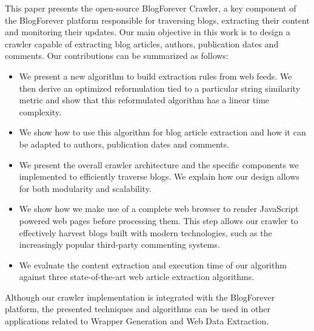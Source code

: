 This paper presents the open-source BlogForever Crawler, a key component of the BlogForever platform \cite{kasioumis2013towards} responsible for traversing blogs, extracting their content and monitoring their updates. Our main objective in this work is to design a crawler capable of extracting blog articles, authors, publication dates and comments. Our contributions can be summarized as follows:

\begin{itemize}
  \item We present a new algorithm to build extraction rules from web feeds. We then derive an optimized reformulation tied to a particular string similarity metric and show that this reformulated algorithm has a linear time complexity.
  \item We show how to use this algorithm for blog article extraction and how it can be adapted to authors, publication dates and comments.
  \item We present the overall crawler architecture and the specific components we implemented to efficiently traverse blogs. We explain how our design allows for both modularity and scalability.
  \item We show how we make use of a complete web browser to render JavaScript powered web pages before processing them. This step allows our crawler to effectively harvest blogs built with modern technologies, such as the increasingly popular third-party commenting systems.
  \item We evaluate the content extraction and execution time of our algorithm against three state-of-the-art web article extraction algorithms.
\end{itemize}
  
Although our crawler implementation is integrated with the BlogForever platform, the presented techniques and algorithms can be used in other applications related to Wrapper Generation and Web Data Extraction.
